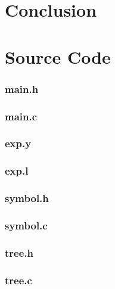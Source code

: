 \documentclass{article}
\begin{document}
\section{Conclusion}

\newpage

\appendix

\section{Source Code}

\subsubsection{main.h}


\subsubsection{main.c}


\subsubsection{exp.y}


\subsubsection{exp.l}


\subsubsection{symbol.h}


\subsubsection{symbol.c}


\subsubsection{tree.h}


\subsubsection{tree.c}

\end{document}
